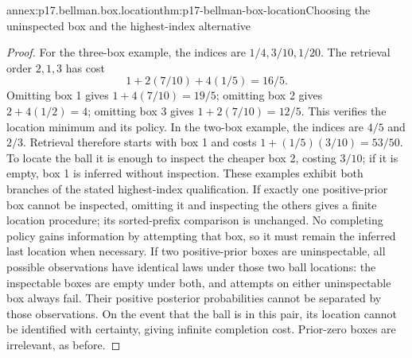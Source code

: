 \begin{annexitem}{annex:p17.bellman.box.location}{thm:p17-bellman-box-location}{Choosing the uninspected box and the highest-index alternative}
\begin{proof}
For the three-box example,
the indices are \(1/4,3/10,1/20\).
The retrieval order \(2,1,3\)
has cost
\[
                1+2(7/10)+4(1/5)=16/5.
\]
Omitting box 1 gives
\(1+4(7/10)=19/5\);
omitting box 2 gives
\(2+4(1/2)=4\);
omitting box 3 gives
\(1+2(7/10)=12/5\).
This verifies the location
minimum and its policy.
In the two-box example,
the indices are \(4/5\)
and \(2/3\). Retrieval
therefore starts with box 1
and costs
\(1+(1/5)(3/10)=53/50\).
To locate the ball it is
enough to inspect the cheaper
box 2, costing \(3/10\);
if it is empty, box 1 is
inferred without inspection.
These examples exhibit both
branches of the stated
highest-index qualification.
If exactly one positive-prior box cannot be
inspected, omitting it and inspecting the
others gives a finite location procedure;
its sorted-prefix comparison is unchanged.
No completing policy gains information
by attempting that box, so it must remain
the inferred last location when necessary.
If two positive-prior boxes are uninspectable,
all possible observations have identical
laws under those two ball locations:
the inspectable boxes are empty under both,
and attempts on either uninspectable box
always fail. Their positive posterior
probabilities cannot be separated by those
observations. On the event that the ball
is in this pair, its location cannot be
identified with certainty, giving infinite
completion cost. Prior-zero boxes are
irrelevant, as before.
\end{proof}
\end{annexitem}

